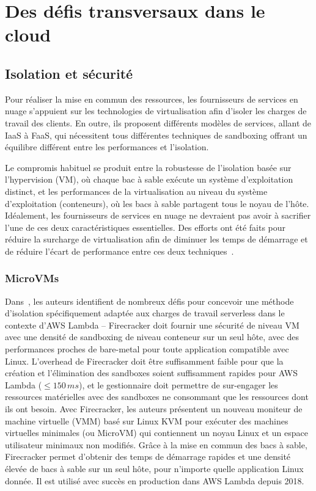 \section{Des défis transversaux dans le cloud}

\subsection{Isolation et sécurité} \label{sota-isolation}

Pour réaliser la mise en commun des ressources, les fournisseurs de services en nuage s'appuient sur les technologies de virtualisation afin d'isoler les charges de travail des clients. En outre, ils proposent différents modèles de services, allant de IaaS à FaaS, qui nécessitent tous différentes techniques de sandboxing offrant un équilibre différent entre les performances et l'isolation.

Le compromis habituel se produit entre la robustesse de l'isolation basée sur l'hypervision (VM), où chaque bac à sable exécute un système d'exploitation distinct, et les performances de la virtualisation au niveau du système d'exploitation (conteneurs), où les bacs à sable partagent tous le noyau de l'hôte. Idéalement, les fournisseurs de services en nuage ne devraient pas avoir à sacrifier l'une de ces deux caractéristiques essentielles. Des efforts ont été faits pour réduire la surcharge de virtualisation afin de diminuer les temps de démarrage et de réduire l'écart de performance entre ces deux techniques~\cite{mancoMyVMLighter2017}.

\subsubsection{MicroVMs}

Dans~\cite{agacheFirecrackerLightweightVirtualization}, les auteurs identifient de nombreux défis pour concevoir une méthode d'isolation spécifiquement adaptée aux charges de travail serverless dans le contexte d'AWS Lambda -- Firecracker doit fournir une sécurité de niveau VM avec une densité de sandboxing de niveau conteneur sur un seul hôte, avec des performances proches de bare-metal pour toute application compatible avec Linux. L'overhead de Firecracker doit être suffisamment faible pour que la création et l'élimination des sandboxes soient suffisamment rapides pour AWS Lambda ($\leq 150 \, ms$), et le gestionnaire doit permettre de sur-engager les ressources matérielles avec des sandboxes ne consommant que les ressources dont ils ont besoin. Avec Firecracker, les auteurs présentent un nouveau moniteur de machine virtuelle (VMM) basé sur Linux KVM pour exécuter des machines virtuelles minimales (ou MicroVM) qui contiennent un noyau Linux et un espace utilisateur minimaux non modifiés. Grâce à la mise en commun des bacs à sable, Firecracker permet d'obtenir des temps de démarrage rapides et une densité élevée de bacs à sable sur un seul hôte, pour n'importe quelle application Linux donnée. Il est utilisé avec succès en production dans AWS Lambda depuis 2018.

